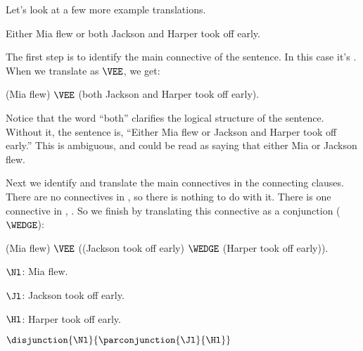 Let's look at a few more example translations.

\begin{majorILnc}{} %
	\begin{menumerate}
		\item\label{GSLTransSentenceE} Either Mia flew or both Jackson and Harper took off early.
	\end{menumerate} 
	The first step is to identify the main connective of the sentence. 
	In this case it's . When we translate  as $\VEE$, we get: 
	\begin{menumerate}
		\item\label{GSLTransSentenceF} (Mia flew) $\VEE$ (both Jackson and Harper took off early).
	\end{menumerate}
	Notice that the word ``both'' clarifies the logical structure of the sentence. Without it, the sentence is, ``Either Mia flew or Jackson and Harper took off early.'' This is ambiguous, and could be read as saying that either Mia or Jackson flew. 
	
	Next we identify and translate the main connectives in the connecting clauses. 
	There are no connectives in , so there is nothing to do with it. 
	There is one connective in , . 
	So we finish by translating this connective as a conjunction ($\WEDGE$):  
	\begin{menumerate}
		\item\label{GSLTransSentenceG} (Mia flew) $\VEE$ ((Jackson took off early) $\WEDGE$ (Harper took off early)).
	\end{menumerate}
	\begin{description}[itemsep=0em]
		\item[Translation Key:] \hfill{} 
		\begin{description}[itemsep=0em]
			\item[] $\Nl$: Mia flew.
			\item[] $\Jl$: Jackson took off early. 
			\item[] $\Hl$: Harper took off early. 
		\end{description}
	\end{description}
	\begin{menumerate}
		\item\label{GSLTransSentenceH} $\disjunction{\Nl}{\parconjunction{\Jl}{\Hl}}$
	\end{menumerate}
\end{majorILnc}

